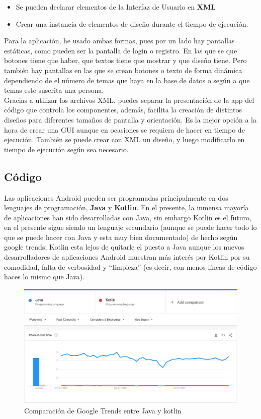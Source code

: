 \begin{itemize}
\item Se pueden declarar elementos de la Interfaz de Usuario en \textbf{XML}
\item Crear una instancia de elementos de diseño durante el tiempo de ejecución.
\end{itemize}

Para la aplicación, he usado ambas formas, pues por un lado hay pantallas estáticas, como pueden ser la pantalla de login o registro. En las que se que botones tiene que haber, que textos tiene que mostrar y que diseño tiene. Pero también hay pantallas en las que se crean botones o texto de forma dinámica dependiendo de el número de temas que haya en la base de datos o según a que temas este suscrita una persona. \\

Gracias a utilizar los archivos XML, puedes separar la presentación de la app del código que controla los componentes, además, facilita la creación de distintos diseños para diferentes tamaños de pantalla y orientación. Es la mejor opción a la hora de crear una GUI aunque en ocasiones se requiera de hacer en tiempo de ejecución. También se puede crear con XML un diseño, y luego modificarlo en tiempo de ejecución según sea necesario. 

\subsection{Código} \label{sec:Codigo}

Las aplicaciones Android pueden ser programadas principalmente en dos lenguajes de programación, \textbf{Java} y \textbf{Kotlin}. En el presente, la inmensa mayoría de aplicaciones han sido desarrolladas con Java, sin embargo Kotlin es el futuro, en el presente sigue siendo un lenguaje secundario (aunque se puede hacer todo lo que se puede hacer con Java y esta muy bien documentado) de hecho según google trends, Kotlin esta lejos de quitarle el puesto a Java aunque los nuevos desarrolladores de aplicaciones Android muestran más interés por Kotlin por su comodidad, falta de verbosidad y ``limpieza'' (es decir, con menos líneas de código haces lo mismo que Java). 

\begin{figure}[h!]
  \centering
  \includegraphics[width=0.6\linewidth]{figs/Desarrollo/Popularidad}
  \caption[Java vs Kotlin]{Comparación de Google Trends entre Java y kotlin}
  \label{fig:java_vs_kotlin}
\end{figure}

